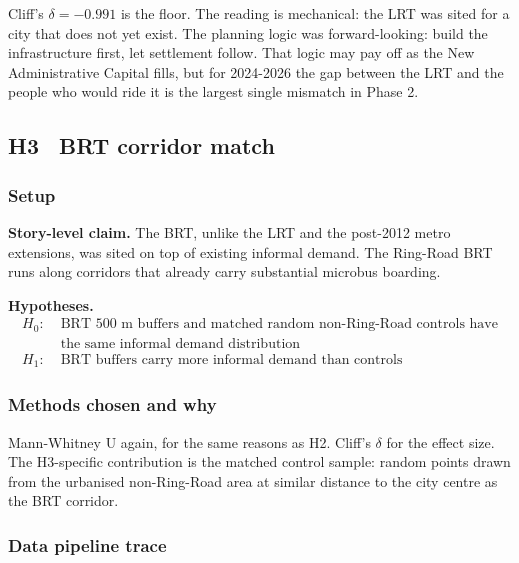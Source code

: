 \begin{callout}
Cliff's $\delta = -0.991$ is the floor. The reading is
mechanical: the LRT was sited for a city that does not yet exist. The
planning logic was forward-looking: build the infrastructure first,
let settlement follow. That logic may pay off as the New Administrative
Capital fills, but for 2024-2026 the gap between the LRT and the
people who would ride it is the largest single mismatch in Phase 2.
\end{callout}

\subsection{H3 \textbullet\ BRT corridor match}
\label{sec:h3}

\subsubsection{Setup}

\textbf{Story-level claim.} The BRT, unlike the LRT and the post-2012
metro extensions, was sited on top of existing informal demand. The
Ring-Road BRT runs along corridors that already carry substantial
microbus boarding.

\textbf{Hypotheses.}
\begin{align*}
 H_0:\;& \text{BRT 500 m buffers and matched random non-Ring-Road controls have} \\
 & \text{the same informal demand distribution} \\
 H_1:\;& \text{BRT buffers carry more informal demand than controls}
\end{align*}

\subsubsection{Methods chosen and why}

Mann-Whitney U again, for the same reasons as H2. Cliff's $\delta$
for the effect size. The H3-specific contribution is the matched
control sample: random points drawn from the urbanised non-Ring-Road
area at similar distance to the city centre as the BRT corridor.

\subsubsection{Data pipeline trace}

